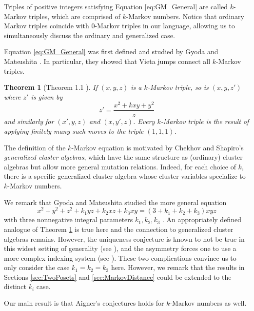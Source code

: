 \documentclass[12pt, letterpaper,table]{amsart}
\newtheorem{theorem}{Theorem}
\theoremstyle{remark}
\begin{document}
Triples of positive integers satisfying Equation \ref{eq:GM_General} are called $k$-Markov triples, which are comprised of $k$-Markov numbers. Notice that ordinary Markov triples  coincide with 0-Markov triples in our language, allowing us to simultaneously discuss the ordinary and generalized case. 

Equation \ref{eq:GM_General} was first defined and studied by Gyoda and Matsushita \cite{GyodaMatsushita}. In particular, they showed that Vieta jumps connect all $k$-Markov triples.
\begin{theorem}[Theorem 1.1 \cite{GyodaMatsushita}]\label{thm:GM}
If $(x,y,z)$ is a $k$-Markov triple, so is $(x,y,z')$ where $z'$ is given by \begin{equation}
z' = \frac{x^2 + kxy + y^2}{z} \label{eq:GenVieta}
\end{equation}
and similarly for $(x',y,z)$ and $(x,y',z)$. Every $k$-Markov triple is the result of applying finitely many such moves to the triple $(1,1,1)$. 
\end{theorem}

 The definition of the $k$-Markov equation is motivated by Chekhov and Shapiro's \emph{generalized cluster algebras}, which have the same structure as (ordinary) cluster algebras but allow more general mutation relations. Indeed, for each choice of $k$, there is a specific generalized cluster algebra whose cluster variables specialize to $k$-Markov numbers. 
 
 We remark that  Gyoda and Matsushita studied the more general equation \begin{equation}
x^2 + y^2 + z^2 + k_1yz + k_2 xz + k_3 xy = (3+k_1 + k_2 + k_3)xyz
 \label{eq:DistinctKs}\end{equation}
with three nonnegative integral parameters $k_1,k_2,k_3$ \cite{GyodaMatsushita} . An appropriately defined analogue of Theorem \ref{thm:GM} is true here and the connection to generalized cluster algebras remains. However, the uniqueness conjecture is known to not be true in this widest setting of generality (see \cite[Remark 2.8]{GyodaMatsushita}), and the asymmetry forces one to use a more complex indexing system (see \cite[Section 3.4]{BG}). These two complications convince us to only consider the case $k_1 = k_2 = k_3$ here. However, we remark that the results in Sections \ref{sec:TwoPosets} and \ref{sec:MarkovDistance} could be extended to the distinct $k_i$ case. 

Our main result is that Aigner's conjectures holds for $k$-Markov numbers as well.
\end{document}

